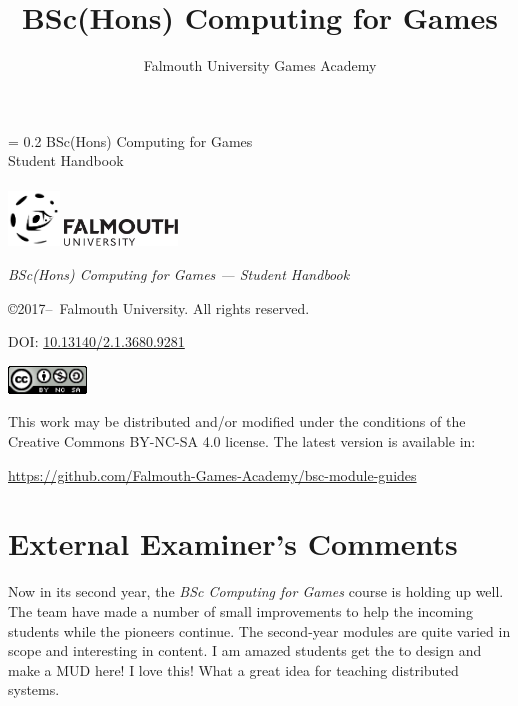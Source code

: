 \documentclass[10pt, a5paper, twoside, openright, titlepage]{memoir}\usepackage{etoolbox}\newtoggle{printable}\toggletrue{printable}\newtoggle{isBeamer}\togglefalse{isBeamer}
\author{Falmouth University Games Academy}
\title{BSc(Hons) Computing for Games}
\date{\academicYear}
\newcommand*{\FSfont}[1]{\fontencoding{T1}\fontfamily{#1}\selectfont}
\newcommand*{\titleRF}{
\begingroup%
\drop = 0.2\textheight
\centering
{\vspace{1cm}
\huge BSc(Hons) Computing for Games}\\[\baselineskip]
{\Huge Student Handbook}\\[\baselineskip]
{\large \academicYear}\\[0.5\drop]
\vfill
{\includegraphics[height=4em]{GamesLogoAt}	
\includegraphics[height=2em]{FalmouthLogo}}\\[0.5\baselineskip]
\endgroup}
\newlength{\drop}%
\begin{document}
\thispagestyle{empty}
\titleRF
\pagebreak

\thispagestyle{empty}
\null\vfill

\begin{small}
\begin{flushleft}
\textit{BSc(Hons) Computing for Games --- Student Handbook}

\copyright  2017--\the\year\ Falmouth University. All rights reserved.

\bigskip

DOI: \url{10.13140/2.1.3680.9281}

\vspace{3em}

\includegraphics[height=2em]{ccbyncnd4-88x31}	

\footnotesize This work may be distributed and/or modified under the conditions of the Creative Commons BY-NC-SA 4.0 license. The latest version is available in:

\smallskip

\url{https://github.com/Falmouth-Games-Academy/bsc-module-guides}

\end{flushleft}
\end{small}



\frontmatter

\begin{small}
	\tableofcontents
\end{small}

\newpage

\section*{External Examiner's Comments}

Now in its second year, the \textit{BSc Computing for Games} course is holding up well. The team have made a number of small improvements to help the incoming students while the pioneers continue. The second-year modules are quite varied in scope and interesting in content. I am amazed students get the to design and make a MUD here! I love this! What a great idea for teaching distributed systems.\\
\end{document}
